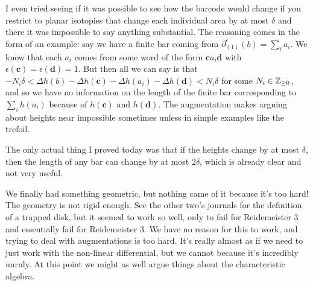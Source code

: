 \documentclass[11pt,oneside]{amsart}
\begin{document}
I even tried seeing if it was possible to see how the barcode would change if you restrict to planar isotopies that change each individual area by at most $\delta$ and there it was impossible to say anything substantial. The reasoning comes in the form of an example: say we have a finite bar coming from $\partial^\epsilon_{(1)}(b)=\sum_i a_i$. We know that each $a_i$ comes from some word of the form $\mathbf{c}a_i\mathbf{d}$ with $\epsilon(\mathbf{c})=\epsilon(\mathbf{d})=1$. But then all we can say is that $-N_i\delta< \Delta h(b)-\Delta h(\mathbf{c})-
\Delta h(a_i)-\Delta h(\mathbf{d})<N_i\delta$ for some $N_i\in \mathbb Z_{\geq 0}$, and so we have no information on the length of the finite bar corresponding to $\sum_i h(a_i)$ because of $h(\mathbf{c})$ and $h(\mathbf{d})$. The augmentation makes arguing about heights near impossible sometimes unless in simple examples like the trefoil.

The only actual thing I proved today was that if the heights change by at most $\delta$, then the length of any bar can change by at most $2\delta$, which is already clear and not very useful.

We finally had something geometric, but nothing came of it because it's too hard! The geometry is not rigid enough. See the other two's journals for the definition of a trapped disk, but it seemed to work so well, only to fail for Reidemeister 3 and essentially fail for Reidemeister 3. We have no reason for this to work, and trying to deal with augmentations is too hard. It's really almost as if we need to just work with the non-linear differential, but we cannot because it's incredibly unruly. At this point we might as well argue things about the characteristic algebra.
\end{document}
